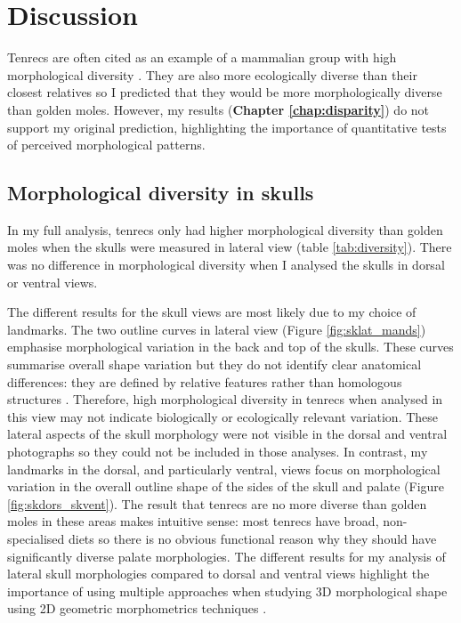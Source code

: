 \chapter{Discussion}
\label{chap:discussion}

\noindent

Tenrecs are often cited as an example of a mammalian group with high morphological diversity \citep{Olson2013, Soarimalala2011, Eisenberg1969}. They are also more ecologically diverse than their closest relatives \citep{Soarimalala2011, Bronner1995} so I predicted that they would be more morphologically diverse than golden moles. However, my results (\textbf{Chapter \ref{chap:disparity}}) do not support my original prediction, highlighting the importance of quantitative tests of perceived morphological patterns.

\section{Morphological diversity in skulls}

	In my full analysis, tenrecs only had higher morphological diversity than golden moles when the skulls were measured in lateral view (table \ref{tab:diversity}). There was no difference in morphological diversity when I analysed the skulls in dorsal or ventral views.
	 
	The different results for the skull views are most likely due to my choice of landmarks. The two outline curves in lateral view (Figure \ref{fig:sklat_mands}) emphasise morphological variation in the back and top of the skulls. These curves summarise overall shape variation but they do not identify clear anatomical differences: they are defined by relative features rather than homologous structures \citep{Zelditch2012}. Therefore, high morphological diversity in tenrecs when analysed in this view may not indicate biologically or ecologically relevant variation.	
	These lateral aspects of the skull morphology were not visible in the dorsal and ventral photographs so they could not be included in those analyses. In contrast, my landmarks in the dorsal, and particularly ventral, views focus on morphological variation in the overall outline shape of the sides of the skull and palate (Figure \ref{fig:skdors_skvent}). The result that tenrecs are no more diverse than golden moles in these areas makes intuitive sense: most tenrecs have broad, non-specialised diets \citep{Olson2013} so there is no obvious functional reason why they should have significantly diverse palate morphologies.
	The different results for my analysis of lateral skull morphologies compared to dorsal and ventral views highlight the importance of using multiple approaches when studying 3D morphological shape using 2D geometric morphometrics techniques \citep{Arnqvist1998}.

